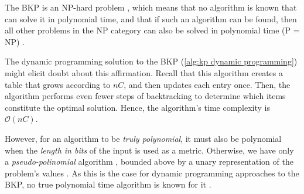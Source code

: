 The BKP is an NP-hard problem \cite{PISINGER2005}, which means that no algorithm is known that can solve it in polynomial time, and that if such an algorithm can be found, then all other problems in the NP category can also be solved in polynomial time (P = NP) \cite{ERICKSON2019}.

The dynamic programming solution to the BKP (\cref{alg:kp dynamic programming}) might elicit doubt about this affirmation. Recall that this algorithm creates a table that grows according to $nC$, and then updates each entry once. Then, the algorithm performs even fewer steps of backtracking to determine which items constitute the optimal solution. Hence, the algorithm's time complexity is $\mathcal{O}(nC)$.

However, for an algorithm to be \emph{truly polynomial}, it must also be polynomial when the \emph{length in bits} of the input is used as a metric. Otherwise, we have only a \emph{pseudo-polinomial} algorithm \cite{WENDLAND}, bounded above by a unary representation of the problem's values \cite{VAZIRANI2001}. As this is the case for dynamic programming approaches to the BKP, no true polynomial time algorithm is known for it \cite{DUDLEY2016,PISINGER2005}.